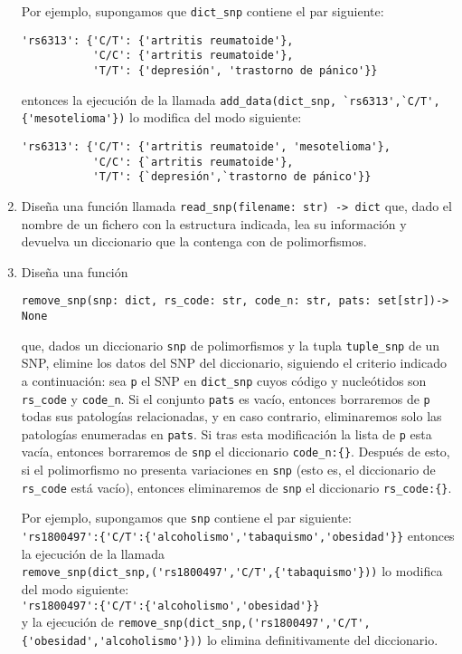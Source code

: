 \documentclass[a4paper,10pt]{article}
\begin{document}
\begin{enumerate}
Por ejemplo, supongamos que \lstinline{dict_snp} contiene el par siguiente: \\
\begin{lstlisting}
'rs6313': {'C/T': {'artritis reumatoide'},
           'C/C': {'artritis reumatoide'},
           'T/T': {'depresión', 'trastorno de pánico'}}
\end{lstlisting}


entonces la ejecución de la llamada
\lstinline|add_data(dict_snp, `rs6313',`C/T', {'mesotelioma'})| lo modifica del modo siguiente: \\
\begin{lstlisting}
'rs6313': {'C/T': {'artritis reumatoide', 'mesotelioma'},
           'C/C': {`artritis reumatoide'},
           'T/T': {`depresión',`trastorno de pánico'}}
\end{lstlisting}

\item
  Diseña una función llamada \lstinline{read_snp(filename: str) -> dict} que,
  dado el nombre de un fichero con la estructura indicada, lea
  su información y devuelva un diccionario que la contenga con
  de polimorfismos.

\item Diseña una función
\begin{lstlisting}
remove_snp(snp: dict, rs_code: str, code_n: str, pats: set[str])-> None
\end{lstlisting}
  que, dados un
  diccionario \lstinline{snp} de polimorfismos y la tupla
  \lstinline{tuple_snp} de un SNP, elimine los datos del SNP del
  diccionario, siguiendo el criterio indicado a continuación: sea
  \lstinline{p} el SNP en \lstinline{dict_snp} cuyos código y
  nucleótidos son \lstinline{rs_code} y
  \lstinline{code_n}. Si el conjunto \lstinline{pats}
  es vacío, entonces borraremos de
  \lstinline{p} todas sus patologías relacionadas, y en caso
  contrario, eliminaremos solo las patologías enumeradas en
  \lstinline{pats}. Si tras esta modificación la lista de
  \lstinline{p} esta vacía, entonces borraremos de
  \lstinline{snp} el diccionario \lstinline|code_n:{}|. Después de esto,
  si el polimorfismo no presenta variaciones en \lstinline{snp}
  (esto es, el diccionario de \lstinline{rs_code} está vacío), entonces
  eliminaremos de \lstinline{snp} el diccionario \lstinline|rs_code:{}|.

  Por ejemplo, supongamos que \lstinline{snp} contiene el par siguiente:\\
  \lstinline|'rs1800497':{'C/T':{'alcoholismo','tabaquismo','obesidad'}}|
  entonces la ejecución de la llamada \\
  \lstinline|remove_snp(dict_snp,('rs1800497','C/T',{'tabaquismo'}))| lo modifica del modo siguiente:\\
  \lstinline|'rs1800497':{'C/T':{'alcoholismo','obesidad'}}|\\
  y la ejecución de \lstinline|remove_snp(dict_snp,('rs1800497','C/T',{'obesidad','alcoholismo'}))| lo elimina definitivamente del diccionario.


\end{enumerate}
\end{document}
